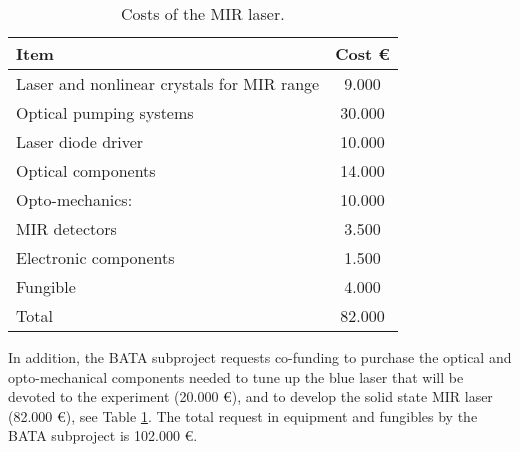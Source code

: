 \begin{table}[h!]
\begin{center}
\begin{tabular}{|l|c|}
\hline
 Item & Cost \euro  \\
 \hline
Laser and nonlinear crystals for MIR range &  9.000 \\
Optical pumping systems & 30.000 \\
Laser diode driver & 10.000  \\
Optical components &14.000 \\
Opto-mechanics: &10.000 \\
MIR detectors & 3.500 \\
Electronic components & 1.500\\
Fungible & 4.000 \\
  \hline
 Total &  82.000 \\
 \hline
\end{tabular}  
\caption{Costs of the MIR laser.}
\label{tab.MIR}
\end{center}
\end{table} 

In addition, the BATA subproject requests co-funding to purchase the optical and opto-mechanical components needed to tune up the blue laser that will be devoted to the experiment (20.000 \euro), and to develop the solid state MIR laser (82.000 \euro), see Table \ref{tab.MIR}. The total request in equipment and fungibles by the BATA subproject is 102.000 \euro.

